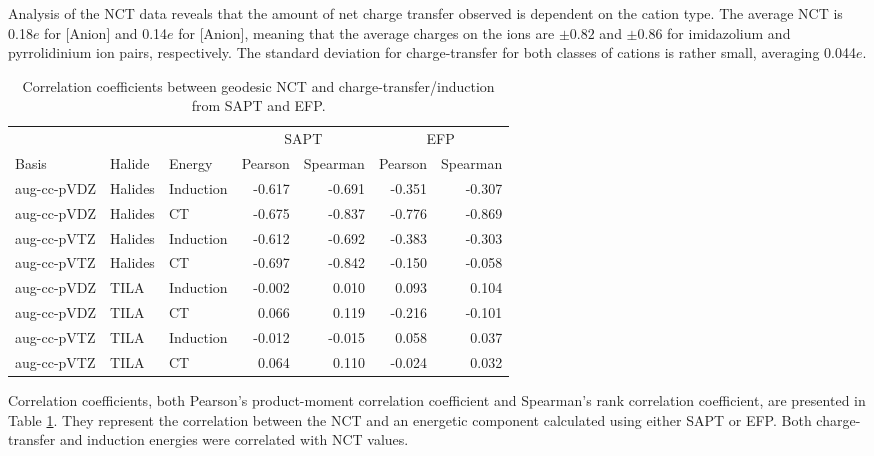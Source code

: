 Analysis of the NCT data reveals that the amount of net charge transfer observed is dependent on the cation type.
The average NCT is 0.18$e$ for [Anion] and 0.14$e$ for [Anion], meaning that the average charges on the ions are $\pm 0.82$ and $\pm 0.86$ for imidazolium and pyrrolidinium ion pairs, respectively.
The standard deviation for charge-transfer for both classes of cations is rather small, averaging 0.044$e$.


\begin{table}
    \centering
    \footnotesize
\caption{Correlation coefficients between geodesic NCT and charge-transfer/induction from SAPT and EFP.}
\label{tab:geod-corr}
\begin{tabular}{lll|rr|rr}
        \hline
               &            &            & \multicolumn{2}{c}{SAPT} & \multicolumn{2}{c}{EFP} \\
  Basis        & Halide     & Energy     & Pearson    & Spearman    & Pearson    & Spearman   \\ \hline
  aug-cc-pVDZ  & Halides    & Induction  & -0.617     & -0.691      & -0.351     & -0.307     \\
  aug-cc-pVDZ  & Halides    & CT         & -0.675     & -0.837      & -0.776     & -0.869     \\
  aug-cc-pVTZ  & Halides    & Induction  & -0.612     & -0.692      & -0.383     & -0.303     \\
  aug-cc-pVTZ  & Halides    & CT         & -0.697     & -0.842      & -0.150     & -0.058     \\
  aug-cc-pVDZ  & TILA       & Induction  & -0.002     & 0.010       & 0.093      & 0.104      \\
  aug-cc-pVDZ  & TILA       & CT         & 0.066      & 0.119       & -0.216     & -0.101     \\
  aug-cc-pVTZ  & TILA       & Induction  & -0.012     & -0.015      & 0.058      & 0.037      \\
  aug-cc-pVTZ  & TILA       & CT         & 0.064      & 0.110       & -0.024     & 0.032      \\ \hline
\end{tabular}
\end{table}
  

Correlation coefficients, both Pearson's product-moment correlation coefficient and Spearman's rank correlation coefficient, are presented in Table \ref{tab:geod-corr}.
\cite{Mukaka2012a, Pearson1895a, Edwards1976a}
They represent the correlation between the NCT and an energetic component calculated using either SAPT or EFP. 
Both charge-transfer and induction energies were correlated with NCT values.


